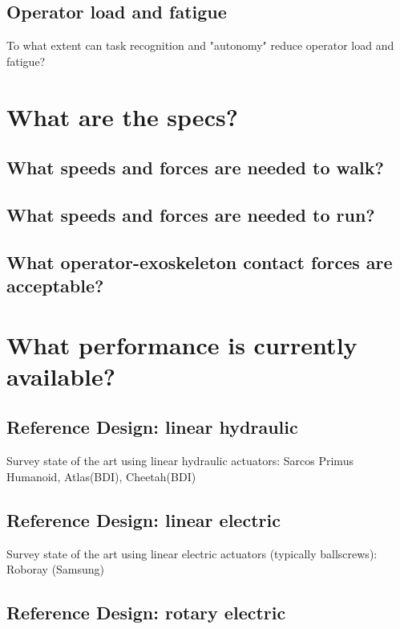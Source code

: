 \documentclass[letterpaper,12pt,fullpage]{article}
\begin{document}
\subsection{Operator load and fatigue}

To what extent can task recognition and "autonomy" reduce operator
load and fatigue?

\section{What are the specs?}

\subsection{What speeds and forces are needed to walk?}

\subsection{What speeds and forces are needed to run?}

\subsection{What operator-exoskeleton contact forces are acceptable?}

\section{What performance is currently available?}

\subsection{Reference Design: linear hydraulic}

Survey state of the art using linear hydraulic actuators:
Sarcos Primus Humanoid, Atlas(BDI), Cheetah(BDI)

\subsection{Reference Design: linear electric}

Survey state of the art using linear electric actuators (typically ballscrews):
Roboray (Samsung)

\subsection{Reference Design: rotary electric}
\end{document}
